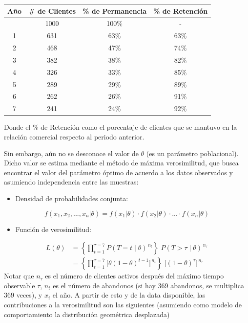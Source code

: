 \documentclass[
]{book}
\newcounter{none} %
\providecommand{\tightlist}{%
  \setlength{\itemsep}{0pt}\setlength{\parskip}{0pt}}
\begin{document}
{\def\LTcaptype{none} %
\begin{longtable}[]{@{}cccc@{}}
\toprule\noalign{}
Año & \# de Clientes & \% de Permanencia & \% de Retención \\
\midrule\noalign{}
\endhead
\bottomrule\noalign{}
\endlastfoot
0 & 1000 & 100\% & - \\
1 & 631 & 63\% & 63\% \\
2 & 468 & 47\% & 74\% \\
3 & 382 & 38\% & 82\% \\
4 & 326 & 33\% & 85\% \\
5 & 289 & 29\% & 89\% \\
6 & 262 & 26\% & 91\% \\
7 & 241 & 24\% & 92\% \\
\end{longtable}
}

Donde el \% de Retención como el porcentaje de clientes que se mantuvo en
la relación comercial respecto al periodo anterior.

Sin embargo, aún no se desconoce el valor de \(\theta\) (es un parámetro
poblacional). Dicho valor se estima mediante el método de máxima
verosimilitud, que busca encontrar el valor del parámetro óptimo de
acuerdo a los datos observados y asumiendo independencia entre las
muestras:

\begin{itemize}
\tightlist
\item
  Densidad de probabilidades conjunta:
\end{itemize}

\[f(x_1,x_2,...,x_n|\theta) = f(x_1|\theta) \cdot f(x_2|\theta) \cdot ... \cdot f(x_n|\theta)\]

\begin{itemize}
\tightlist
\item
  Función de verosimilitud:
\end{itemize}

\[
\begin{aligned}
L(\theta)  &= \left\{\prod_{t=1}^{\tau=7} P(T=t \mid \theta)^{\,n_t}\right\}\; P(T>\tau \mid \theta)^{\,n_{\tau}} \\  &= \left\{\prod_{t=1}^{\tau=7} \big[\theta(1-\theta)^{t-1}\big]^{\,n_t}\right\}\; \big[(1-\theta)^{\tau}\big]^{\,n_{\tau}}
\end{aligned}
\] Notar que \(n_\tau\) es el número de clientes activos después del
máximo tiempo observable \(\tau\), \(n_t\) es el número de abandonos (si hay
369 abandonos, se multiplica 369 veces), y \(x_i\) el año. A partir de
esto y de la data disponible, las contribuciones a la verosimilitud son
las siguientes (asumiendo como modelo de comportamiento la distribución
geométrica desplazada)
\end{document}
